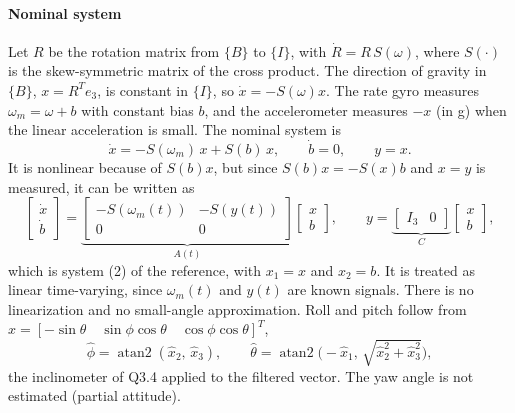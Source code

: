 \documentclass[10pt,a4paper]{article}
\newenvironment{answer}{%
  \begin{tcolorbox}[breakable,enhanced,colback=white,colframe=greyline,
    boxrule=0.6pt,arc=2pt,left=8pt,right=8pt,top=7pt,bottom=7pt,
    before skip=0pt,after skip=12pt]
}{\end{tcolorbox}}
\newcommand{\fB}{\{B\}}
\newcommand{\fI}{\{I\}}
\begin{document}
\begin{answer}
\paragraph{Nominal system}
Let $R$ be the rotation matrix from $\fB$ to $\fI$, with
$\dot R = R\,S(\omega)$, where $S(\cdot)$ is the skew-symmetric matrix
of the cross product. The direction of gravity in $\fB$,
$x = R^Te_3$, is constant in $\fI$, so $\dot x = -S(\omega)x$. The rate
gyro measures $\omega_m = \omega + b$ with constant bias $b$, and the
accelerometer measures $-x$ (in g) when the linear acceleration is
small. The nominal system is
\[
  \dot x = -S(\omega_m)\,x + S(b)\,x, \qquad \dot b = 0, \qquad y = x .
\]
It is nonlinear because of $S(b)x$, but since $S(b)x = -S(x)b$ and
$x=y$ is measured, it can be written as
\[
  \begin{bmatrix}\dot x\\ \dot b\end{bmatrix} =
  \underbrace{\begin{bmatrix} -S(\omega_m(t)) & -S(y(t))\\ 0 & 0 \end{bmatrix}}_{A(t)}
  \begin{bmatrix} x\\ b\end{bmatrix},
  \qquad
  y = \underbrace{\begin{bmatrix} I_3 & 0 \end{bmatrix}}_{C}
  \begin{bmatrix} x\\ b\end{bmatrix},
\]
which is system (2) of the reference, with $x_1 = x$ and $x_2 = b$. It
is treated as linear time-varying, since $\omega_m(t)$ and $y(t)$ are
known signals. There is no linearization and no small-angle
approximation.
Roll and pitch follow from
$x = [-\sin\theta \quad \sin\phi\cos\theta \quad \cos\phi\cos\theta]^T$,
\[
  \hat\phi = \operatorname{atan2}(\hat x_2,\,\hat x_3), \qquad
  \hat\theta = \operatorname{atan2}\!\big(-\hat x_1,\,\sqrt{\hat x_2^2+\hat x_3^2}\big),
\]
the inclinometer of Q3.4 applied to the filtered vector. The yaw angle
is not estimated (partial attitude).


\end{answer}
\end{document}
